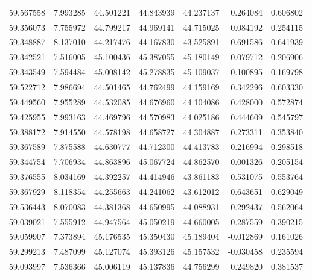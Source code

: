 \begin{tabular}{rrrrrrr}
 59.567558 &   7.993285 &         44.501221 &         44.843939 &         44.237137 &  0.264084 &  0.606802 \\
 59.356073 &   7.755972 &         44.799217 &         44.969141 &         44.715025 &  0.084192 &  0.254115 \\
 59.348887 &   8.137010 &         44.217476 &         44.167830 &         43.525891 &  0.691586 &  0.641939 \\
 59.342521 &   7.516005 &         45.100436 &         45.387055 &         45.180149 & -0.079712 &  0.206906 \\
 59.343549 &   7.594484 &         45.008142 &         45.278835 &         45.109037 & -0.100895 &  0.169798 \\
 59.522712 &   7.986694 &         44.501465 &         44.762499 &         44.159169 &  0.342296 &  0.603330 \\
 59.449560 &   7.955289 &         44.532085 &         44.676960 &         44.104086 &  0.428000 &  0.572874 \\
 59.425955 &   7.993163 &         44.469796 &         44.570983 &         44.025186 &  0.444609 &  0.545797 \\
 59.388172 &   7.914550 &         44.578198 &         44.658727 &         44.304887 &  0.273311 &  0.353840 \\
 59.367589 &   7.875588 &         44.630777 &         44.712300 &         44.413783 &  0.216994 &  0.298518 \\
 59.344754 &   7.706934 &         44.863896 &         45.067724 &         44.862570 &  0.001326 &  0.205154 \\
 59.376555 &   8.034169 &         44.392257 &         44.414946 &         43.861183 &  0.531075 &  0.553764 \\
 59.367929 &   8.118354 &         44.255663 &         44.241062 &         43.612012 &  0.643651 &  0.629049 \\
 59.536443 &   8.070083 &         44.381368 &         44.650995 &         44.088931 &  0.292437 &  0.562064 \\
 59.039021 &   7.555912 &         44.947564 &         45.050219 &         44.660005 &  0.287559 &  0.390215 \\
 59.059907 &   7.373894 &         45.176535 &         45.350430 &         45.189404 & -0.012869 &  0.161026 \\
 59.299213 &   7.487099 &         45.127074 &         45.393126 &         45.157532 & -0.030458 &  0.235594 \\
 59.093997 &   7.536366 &         45.006119 &         45.137836 &         44.756299 &  0.249820 &  0.381537 \\

\end{tabular}
